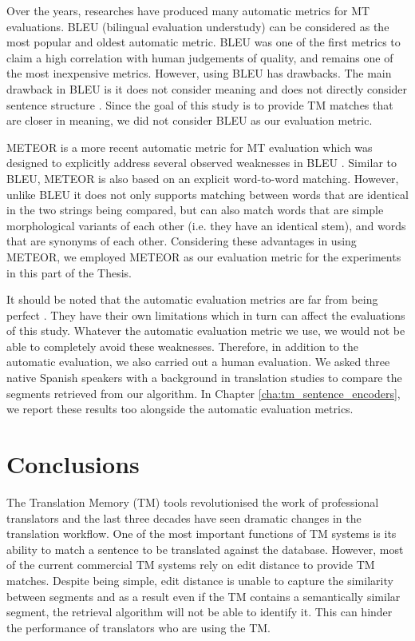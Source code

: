 Over the years, researches have produced many automatic metrics for MT evaluations. BLEU (bilingual evaluation understudy) \cite{papineni-etal-2002-bleu} can be considered as the most popular and oldest automatic metric. BLEU was one of the first metrics to claim a high correlation with human judgements of quality, and remains one of the most inexpensive metrics. However, using BLEU has drawbacks. The main drawback in BLEU is it does not consider meaning and does not directly consider sentence structure \cite{sellam-etal-2020-bleurt}. Since the goal of this study is to provide TM matches that are closer in meaning, we did not consider BLEU as our evaluation metric. 

METEOR is a more recent automatic metric for MT evaluation which was designed to explicitly address several observed weaknesses in BLEU \cite{banerjee-lavie-2005-meteor}. Similar to BLEU, METEOR is also based on an explicit word-to-word matching. However, unlike BLEU it does not only supports matching between words that are identical in the two strings being compared, but can also match words that are simple morphological variants of each other (i.e. they have an identical stem), and words that are synonyms of each other. Considering these advantages in using METEOR, we employed METEOR as our evaluation metric for the experiments in this part of the Thesis. 

It should be noted that the automatic evaluation metrics are far from being perfect \cite{sellam-etal-2020-bleurt}. They have their own limitations which in turn can affect the evaluations of this study. Whatever the automatic evaluation metric we use, we would not be able to completely avoid these weaknesses. Therefore, in addition to the automatic evaluation, we also carried out a human evaluation. We asked three native Spanish speakers with a background in translation studies to compare the segments retrieved from our algorithm. In Chapter \ref{cha:tm_sentence_encoders}, we report these results too alongside the automatic evaluation metrics.

\section{Conclusions}
The Translation Memory (TM) tools revolutionised the work of professional translators and the last three decades have seen dramatic changes in the translation workflow. One of the most important functions of TM systems is its ability to match a sentence to be translated against the database. However, most of the current commercial TM systems rely on edit distance to provide TM matches. Despite being simple, edit distance is unable to capture the similarity between segments and as a result even if the TM contains a semantically similar segment, the retrieval algorithm will not be able to identify it. This can hinder the performance of translators who are using the TM. 

